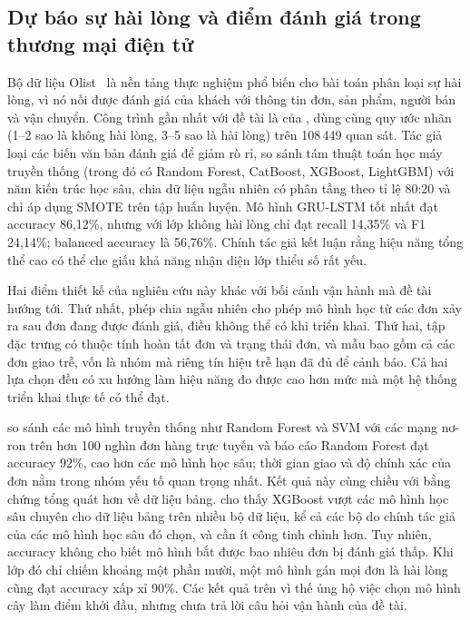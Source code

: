 \documentclass[12pt,a4paper]{report}
\begin{document}
\subsection{Dự báo sự hài lòng và điểm đánh giá trong thương mại điện tử}\label{sec:rel-satisfaction}

Bộ dữ liệu Olist~\parencite{olist2018} là nền tảng thực nghiệm phổ biến cho bài toán phân loại sự hài lòng, vì nó nối được đánh giá của khách với thông tin đơn, sản phẩm, người bán và vận chuyển. Công trình gần nhất với đề tài là của \textcite{orman2026}, dùng cùng quy ước nhãn (1--2 sao là không hài lòng, 3--5 sao là hài lòng) trên 108\,449 quan sát. Tác giả loại các biến văn bản đánh giá để giảm rò rỉ, so sánh tám thuật toán học máy truyền thống (trong đó có Random Forest, CatBoost, XGBoost, LightGBM) với năm kiến trúc học sâu, chia dữ liệu ngẫu nhiên có phân tầng theo tỉ lệ 80:20 và chỉ áp dụng SMOTE trên tập huấn luyện. Mô hình GRU-LSTM tốt nhất đạt accuracy 86,12\%, nhưng với lớp không hài lòng chỉ đạt recall 14,35\% và F1 24,14\%; balanced accuracy là 56,76\%. Chính tác giả kết luận rằng hiệu năng tổng thể cao có thể che giấu khả năng nhận diện lớp thiểu số rất yếu.

Hai điểm thiết kế của nghiên cứu này khác với bối cảnh vận hành mà đề tài hướng tới. Thứ nhất, phép chia ngẫu nhiên cho phép mô hình học từ các đơn xảy ra sau đơn đang được đánh giá, điều không thể có khi triển khai. Thứ hai, tập đặc trưng có thuộc tính hoàn tất đơn và trạng thái đơn, và mẫu bao gồm cả các đơn giao trễ, vốn là nhóm mà riêng tín hiệu trễ hạn đã đủ để cảnh báo. Cả hai lựa chọn đều có xu hướng làm hiệu năng đo được cao hơn mức mà một hệ thống triển khai thực tế có thể đạt.

\textcite{zaghloul2024} so sánh các mô hình truyền thống như Random Forest và SVM với các mạng nơ-ron trên hơn 100 nghìn đơn hàng trực tuyến và báo cáo Random Forest đạt accuracy 92\%, cao hơn các mô hình học sâu; thời gian giao và độ chính xác của đơn nằm trong nhóm yếu tố quan trọng nhất. Kết quả này cùng chiều với bằng chứng tổng quát hơn về dữ liệu bảng. \textcite{shwartzziv2022} cho thấy XGBoost vượt các mô hình học sâu chuyên cho dữ liệu bảng trên nhiều bộ dữ liệu, kể cả các bộ do chính tác giả của các mô hình học sâu đó chọn, và cần ít công tinh chỉnh hơn. Tuy nhiên, accuracy không cho biết mô hình bắt được bao nhiêu đơn bị đánh giá thấp. Khi lớp đó chỉ chiếm khoảng một phần mười, một mô hình gán mọi đơn là hài lòng cũng đạt accuracy xấp xỉ 90\%. Các kết quả trên vì thế ủng hộ việc chọn mô hình cây làm điểm khởi đầu, nhưng chưa trả lời câu hỏi vận hành của đề tài.
\end{document}
